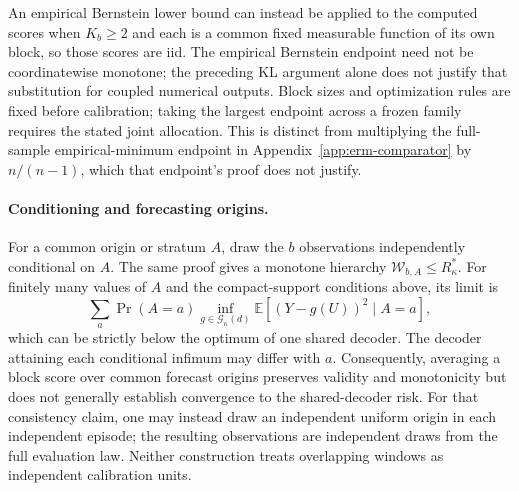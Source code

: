 An empirical Bernstein lower bound can instead be applied to the computed
scores when $K_b\geq2$ and each is a common fixed measurable function of its
own block, so those scores are iid. The empirical Bernstein endpoint need
not be coordinatewise monotone; the preceding KL argument alone does not
justify that substitution for coupled numerical outputs.
Block sizes and optimization rules are fixed before calibration; taking
the largest endpoint across a frozen family requires the stated joint
allocation. This is distinct from multiplying the full-sample
empirical-minimum endpoint in Appendix~\ref{app:erm-comparator} by
$n/(n-1)$, which that endpoint's proof does not justify.

\paragraph{Conditioning and forecasting origins.}
For a common origin or stratum $A$, draw the $b$ observations independently
conditional on $A$. The same proof gives a monotone hierarchy
$\mathcal{W}_{b,A}\leq R^*_\kappa$. For finitely many values of $A$ and the
compact-support conditions above, its limit is
\[
 \sum_a\Pr(A=a)\inf_{g\in\mathcal G_\kappa(d)}
                 \mathbb E[(Y-g(U))^2\mid A=a],
\]
which can be strictly below the optimum of one shared decoder. The
decoder attaining each conditional infimum may differ with $a$.
Consequently, averaging a block score over common forecast origins
preserves validity and monotonicity but does not generally establish
convergence to the shared-decoder risk. For that consistency claim,
one may instead draw an independent uniform origin in each independent
episode; the resulting observations are independent draws from the full
evaluation law. Neither construction treats overlapping windows as
independent calibration units.
